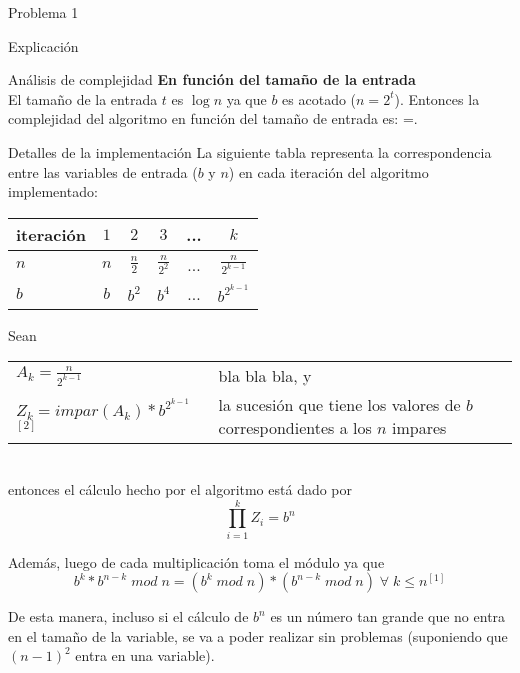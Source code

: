 \begin{section}{Problema 1}
\begin{subsection}{Explicación}
\begin{subsubsection}{Análisis de complejidad}
		\noindent\textbf{En función del tamaño de la entrada}\\

			El tamaño de la entrada $t$ es $\log n$ ya que $b$ es acotado ($n=2^t$). Entonces la complejidad del algoritmo en función del tamaño de entrada es: =.

		\end{subsubsection}
	\end{subsection}

	\begin{subsection}{Detalles de la implementación}
		La siguiente tabla representa la correspondencia entre las variables de entrada ($b$ y $n$) en cada iteración del algoritmo implementado:

		\vspace{0.5cm}
		\begin{center}
		\begin{tabular}{|l|c|c|c|c|c|}
			\hline
			iteración   & $1$ & $2$           & $3$             & ... & $k$ \\
			\hline
			$n$         & $n$ & $\frac{n}{2}$ & $\frac{n}{2^2}$ & ... & $\frac{n}{2^{k-1}}$ \\
			\hline
			$b$         & $b$ & $b^2$         & $b^4$           & ... & $b^{2^{k-1}}$ \\
			\hline
		\end{tabular}
		\end{center}

		\vspace{0.5cm}
		\noindent Sean \\
		\indent
		\begin{tabular}{ll}
			$A_k = \frac{n}{2^{k-1}}$ & bla bla bla, y \\
			$Z_k = impar(A_k) * b^{2^{k-1}}$ $^{[2]}$ & la sucesión que tiene los valores de $b$ correspondientes a los $n$ impares
		\end{tabular} \\
		\vspace{0.2cm}
		entonces el cálculo hecho por el algoritmo está dado por 
		$$\displaystyle\prod_{i=1}^k Z_i = b^n$$

\noindent Además, luego de cada multiplicación toma el módulo ya que
 $$b^k * b^{n-k}\; mod\;n = (b^k\;mod\;n)*(b^{n-k}\;mod\;n)\;\forall\;k\leq n ^{[1]}$$

De esta manera, incluso si el cálculo de $b^n$ es un número tan grande que no entra en el tamaño de la variable, se va a poder realizar sin problemas (suponiendo que $(n-1)^2$ entra en una variable).


\end{subsection}
\end{section}
